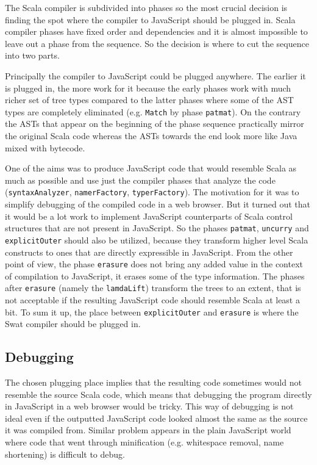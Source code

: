 \documentclass[12pt,a4paper]{report}
\begin{document}
The Scala compiler is subdivided into phases so the most crucial decision is finding the spot where the compiler to JavaScript should be plugged in. Scala compiler phases have fixed order and dependencies and it is almost impossible to leave out a phase from the sequence. So the decision is where to cut the sequence into two parts.

Principally the compiler to JavaScript could be plugged anywhere. The earlier it is plugged in, the more work for it because the early phases work with much richer set of tree types compared to the latter phases where some of the AST types are completely eliminated (e.g. \texttt{Match} by phase \texttt{patmat}). On the contrary the ASTs that appear on the beginning of the phase sequence practically mirror the original Scala code whereas the ASTs towards the end look more like Java mixed with bytecode.

One of the aims was to produce JavaScript code that would resemble Scala as much as possible and use just the compiler phases that analyze the code (\texttt{syntaxAnalyzer}, \texttt{namerFactory}, \texttt{typerFactory}). The motivation for it was to simplify debugging of the compiled code in a web browser. But it turned out that it would be a lot work to implement JavaScript counterparts of Scala control structures that are not present in JavaScript. So the phases \texttt{patmat}, \texttt{uncurry} and \texttt{explicitOuter} should also be utilized, because they transform higher level Scala constructs to ones that are directly expressible in JavaScript. From the other point of view, the phase \texttt{erasure} does not bring any added value in the context of compilation to JavaScript, it erases some of the type information. The phases after \texttt{erasure} (namely the \texttt{lamdaLift}) transform the trees to an extent, that is not acceptable if the resulting JavaScript code should resemble Scala at least a bit. To sum it up, the place between \texttt{explicitOuter} and \texttt{erasure} is where the Swat compiler should be plugged in.

\subsection{Debugging}

The chosen plugging place implies that the resulting code sometimes would not resemble the source Scala code, which means that debugging the program directly in JavaScript in a web browser would be tricky. This way of debugging is not ideal even if the outputted JavaScript code looked almost the same as the source it was compiled from. Similar problem appears in the plain JavaScript world where code that went through minification (e.g. whitespace removal, name shortening) is difficult to debug.
\end{document}
